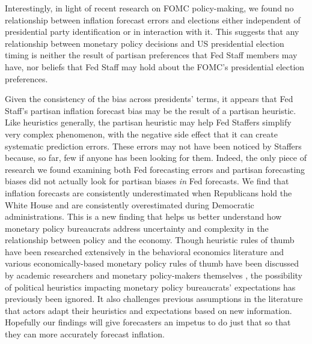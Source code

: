 \documentclass[a4paper]{article}
\begin{document}
Interestingly, in light of recent research on FOMC policy-making, we found no relationship between inflation forecast errors and elections either independent of presidential party identification or in interaction with it. This suggests that any relationship between monetary policy decisions and US presidential election timing is neither the result of partisan preferences that Fed Staff members may have, nor beliefs that Fed Staff may hold about the FOMC's presidential election preferences.

Given the consistency of the bias across presidents' terms, it appears that Fed Staff's partisan inflation forecast bias may be the result of a partisan heuristic. Like heuristics generally, the partisan heuristic may help Fed Staffers simplify very complex phenomenon, with the negative side effect that it can create systematic prediction errors. These errors may not have been noticed by Staffers because, so far, few if anyone has been looking for them. Indeed, the only piece of research we found examining both Fed forecasting errors and partisan forecasting biases \cite[i.e.][]{Frendreis2000} did not actually look for partisan biases {\emph{in}} Fed forecasts. We find that inflation forecasts are consistently underestimated when Republicans hold the White House and are consistently overestimated during Democratic administrations. This is a new finding that helps us better understand how monetary policy bureaucrats address uncertainty and complexity in the relationship between policy and the economy. Though heuristic rules of thumb have been researched extensively in the behavioral economics literature \citep[e.g.][]{kahneman1973, tverskykahneman1974, kahneman2003} and various economically-based monetary policy rules of thumb have been discussed by academic researchers and monetary policy-makers themselves \cite[e.g.][]{McNees1990,Orphanides2008}, the possibility of political heuristics impacting monetary policy bureaucrats’ expectations has previously been ignored. It also challenges previous assumptions in the literature \cite[see in particular][]{Grauwe2011} that actors adapt their heuristics and expectations based on new information. Hopefully our findings will give forecasters an impetus to do just that so that they can more accurately forecast inflation.
\end{document}
